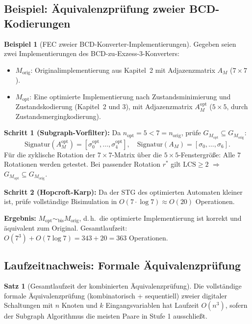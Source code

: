 ﻿\documentclass[a4paper,12pt]{article}
\theoremstyle{definition}
\newtheorem{beispiel}{Beispiel}
\newtheorem{satz}{Satz}
\begin{document}
\subsection{Beispiel: Äquivalenzprüfung zweier BCD-Kodierungen}

\begin{beispiel}[FEC zweier BCD-Konverter-Implementierungen]\label{bsp:fec_bcd}
  Gegeben seien zwei Implementierungen des BCD-zu-Exzess-3-Konverters:
  \begin{itemize}
    \item $M_{\text{orig}}$: Originalimplementierung aus Kapitel~2 mit
          Adjazenzmatrix $A_M$ ($7 \times 7$).
    \item $M_{\text{opt}}$: Eine optimierte Implementierung nach Zustandsminimierung
          und Zustandskodierung (Kapitel~2 und 3), mit Adjazenzmatrix $A_M^{\text{opt}}$
          ($5 \times 5$, durch Zustandsmergingkodierung).
  \end{itemize}

  \textbf{Schritt 1 (Subgraph-Vorfilter):}
  Da $n_{\text{opt}} = 5 < 7 = n_{\text{orig}}$, prüfe $G_{M_{\text{opt}}} \subseteq G_{M_{\text{orig}}}$:
  \[
    \text{Signatur}(A_M^{\text{opt}}) = [\sigma_0^{\text{opt}}, \ldots, \sigma_4^{\text{opt}}],
    \quad
    \text{Signatur}(A_M) = [\sigma_0, \ldots, \sigma_6].
  \]
  Für die zyklische Rotation der $7 \times 7$-Matrix über die $5 \times 5$-Fenstergröße:
  Alle $7$ Rotationen werden getestet. Bei passender Rotation $r^*$ gilt
  $\text{LCS} \geq 2$ $\Rightarrow$ $G_{M_{\text{opt}}} \subseteq G_{M_{\text{orig}}}$.

  \textbf{Schritt 2 (Hopcroft-Karp):}
  Da der STG des optimierten Automaten kleiner ist, prüfe vollständige Bisimulation in
  $O(7 \cdot \log 7) \approx O(20)$ Operationen.

  \textbf{Ergebnis:} $M_{\text{opt}} \sim_{\text{bis}} M_{\text{orig}}$,
  d.\,h.\ die optimierte Implementierung ist korrekt und äquivalent zum Original.
  Gesamtlaufzeit: $O(7^3) + O(7 \log 7) = 343 + 20 = 363$ Operationen.
\end{beispiel}

\subsection{Laufzeitnachweis: Formale Äquivalenzprüfung}

\begin{satz}[Gesamtlaufzeit der kombinierten Äquivalenzprüfung]\label{satz:feclaufzeit}
  Die vollständige formale Äquivalenzprüfung (kombinatorisch + sequentiell) zweier
  digitaler Schaltungen mit $n$ Knoten und $k$ Eingangsvariablen hat Laufzeit $O(n^3)$,
  sofern der Subgraph Algorithmus die meisten Paare in Stufe 1 ausschließt.
\end{satz}
\end{document}
